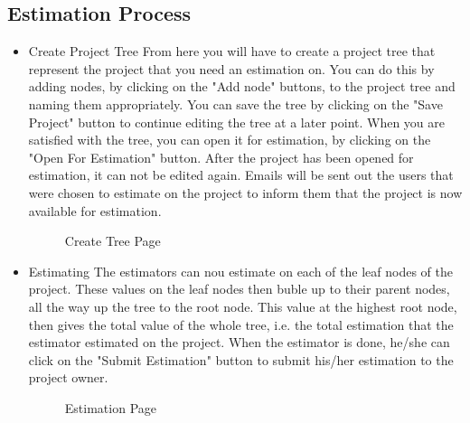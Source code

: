 \subsection{Estimation Process}
\begin{itemize}
	\item{Create Project Tree}
	\newline
	From here you will have to create a project tree that represent the project that you need an estimation on. You can do this by adding nodes, by clicking on the "Add node" buttons, to the project tree and naming them appropriately. You can save the tree by clicking on the "Save Project" button to continue editing the tree at a later point. When you are satisfied with the tree, you can open it for estimation, by clicking on the "Open For Estimation" button. After the project has been opened for estimation, it can not be edited again. Emails will be sent out the users that were chosen to estimate on the project to inform them that the project is now available for estimation.
	\begin{figure}[H]
	    	\centering
	    	\caption{Create Tree Page}
	    	\label{fig:Learning rate 0.1}
   	\end{figure}
	\item{Estimating}
	\newline
	The estimators can nou estimate on each of the leaf nodes of the project. These values on the leaf nodes then buble up to their parent nodes, all the way up the tree to the root node. This value at the highest root node, then gives the total value of the whole tree, i.e. the total estimation that the estimator estimated on the project. When the estimator is done, he/she can click on the "Submit Estimation" button to submit his/her estimation to the project owner.
	\begin{figure}[H]
	    	\centering
	    	\caption{Estimation Page}
	    	\label{fig:Learning rate 0.1}
   	\end{figure}
\end{itemize}
